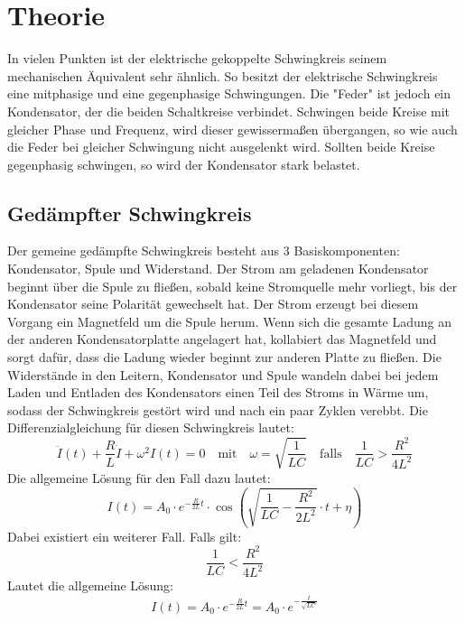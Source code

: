 \section{Theorie}
\label{sec:Theorie}

In vielen Punkten ist der elektrische gekoppelte Schwingkreis seinem mechanischen Äquivalent sehr ähnlich.
So besitzt der elektrische Schwingkreis eine mitphasige und eine gegenphasige Schwingungen. 
Die "Feder" ist jedoch ein Kondensator, der die beiden Schaltkreise verbindet.
Schwingen beide Kreise mit gleicher Phase und Frequenz, wird dieser gewissermaßen übergangen, so wie auch die Feder bei gleicher Schwingung nicht ausgelenkt wird.
Sollten beide Kreise gegenphasig schwingen, so wird der Kondensator stark belastet.
\subsection{Gedämpfter Schwingkreis}
Der gemeine gedämpfte Schwingkreis besteht aus 3 Basiskomponenten: Kondensator, Spule und Widerstand.
Der Strom am geladenen Kondensator beginnt über die Spule zu fließen, sobald keine Stromquelle mehr vorliegt, bis der Kondensator seine Polarität gewechselt hat.
Der Strom erzeugt bei diesem Vorgang ein Magnetfeld um die Spule herum. 
Wenn sich die gesamte Ladung an der anderen Kondensatorplatte angelagert hat, kollabiert das Magnetfeld und sorgt dafür, dass die Ladung wieder beginnt zur anderen Platte zu fließen.
Die Widerstände in den Leitern, Kondensator und Spule wandeln dabei bei jedem Laden und Entladen des Kondensators einen Teil des Stroms in Wärme um, sodass der Schwingkreis gestört wird und nach ein paar Zyklen verebbt.
Die Differenzialgleichung für diesen Schwingkreis lautet:
\begin{equation}
    \ddot{I}(t) + \frac{R}{L}\dot{I} + \omega^2 I(t) = 0 \quad\textrm{mit}\quad \omega = \sqrt{\frac{1}{LC}}
    \quad\textrm{falls}\quad \frac{1}{LC} > \frac{R^2}{4L^2}
    \label{eq:harmossi}
\end{equation}
Die allgemeine Lösung für den Fall dazu lautet:
\begin{equation}
    I(t) = A_0 \cdot e^{-\frac{R}{2L}t} \cdot \cos{(\sqrt{\frac{1}{LC}-\frac{R^2}{2L^2}}\cdot t+\eta)}
\end{equation}
Dabei existiert ein weiterer Fall. Falls gilt:
\begin{equation}
    \frac{1}{LC} < \frac{R^2}{4L^2}
\end{equation}
Lautet die allgemeine Lösung:
\begin{equation}
    I(t) = A_0 \cdot e^{-\frac{R}{2L}t} = A_0 \cdot e^{-\frac{t}{\sqrt{LC}}}
    \label{eq:harmossi2}
\end{equation}

